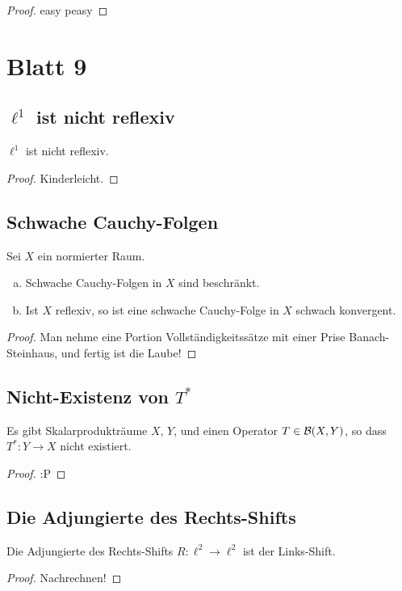 \documentclass[FunkAnaSkriptSS2017.tex]{subfiles} %
\begin{document}
	\begin{proof}
	easy peasy
	\end{proof}


\newpage 
\section{ Blatt 9}

\subsection{ $\ell^1$ ist nicht reflexiv}
	$\ell^1$ ist nicht reflexiv.
	
	\begin{proof}
	Kinderleicht.
	\end{proof}


\subsection{ Schwache Cauchy-Folgen}
	Sei $X$ ein normierter Raum.
	\begin{enumerate}[(a)]
	\item Schwache Cauchy-Folgen in $X$ sind beschränkt.
	\item Ist $X$ reflexiv, so ist eine schwache Cauchy-Folge in $X$ schwach konvergent.	
	\end{enumerate}	 

	\begin{proof}
	Man nehme eine Portion Vollständigkeitssätze mit einer Prise Banach-Steinhaus, und fertig ist die Laube!
	\end{proof}
	
\subsection{ Nicht-Existenz von $T^*$}
	Es gibt Skalarprodukträume $X,\,Y$, und einen Operator $T\in \mathcal{B}(X,Y)$, so dass $T^* : Y \to X$ nicht existiert.
	
	\begin{proof}
	:P
	\end{proof}


\subsection{ Die Adjungierte des Rechts-Shifts}
	Die Adjungierte des Rechts-Shifts $R:\ell^2 \to \ell ^2$ ist der Links-Shift.
	\begin{proof}
	Nachrechnen!
	\end{proof}
\end{document}
